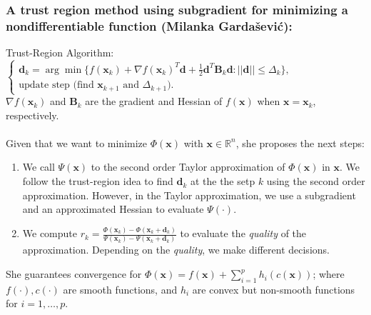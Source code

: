 \documentclass[aspectratio=169]{beamer}\usepackage[utf8]{inputenc}
\newcommand{\R}{\mathbb{R}}
\begin{document}
\begin{frame}\frametitle{{\small A trust region method using subgradient for minimizing a nondifferentiable function (Milanka Gardašević):}}

Trust-Region Algorithm: $\begin{cases}\bm{d}_k=\arg\min\{f(\bm{x}_k)+\nabla f(\bm{x}_k)^T\bm{d}+\frac{1}{2}\bm{d}^T\bm{B}_k\bm{d}:||\bm{d}||\leq\Delta_k\},\\
\text{update step (find $\bm{x}_{k+1}$ and $\Delta_{k+1}$).}\end{cases}$\\
$\nabla f(\bm{x}_k)$ and $\bm{B}_k$ are the gradient and Hessian of $f(\bm{x})$ when $\bm{x}=\bm{x}_k$, respectively.\\
\quad\\
Given that we want to minimize $\Phi(\bm{x})$ with $\bm{x}\in\R^n$, she proposes the next steps:

\begin{enumerate}

\item We call $\Psi(\bm{x})$ to the second order Taylor approximation of $\Phi(\bm{x})$ in $\bm{x}$. We follow the trust-region idea to find $\bm{d}_k$ at the the setp $k$ using the second order approximation. However, in the Taylor approximation, we use a subgradient and an approximated Hessian to evaluate $\Psi(\cdot)$.

\item We compute $r_k=\frac{\Phi(\bm{x}_k)-\Phi(\bm{x}_k+\bm{d}_k)}{\Psi(\bm{x}_k)-\Psi(\bm{x}_k+\bm{d}_k)}$ to evaluate the \emph{quality} of the approximation. Depending on the \emph{quality}, we make different decisions.

\end{enumerate}

She guarantees convergence for $\Phi(\bm{x})=f(\bm{x})+\sum_{i=1}^ph_i(c(\bm{x}))$; where $f(\cdot),c(\cdot)$ are smooth functions, and $h_i$ are convex but non-smooth functions for $i=1,\dots,p$.

\end{frame}
\end{document}
